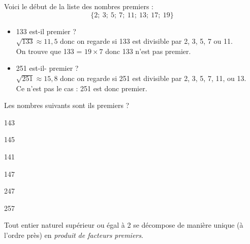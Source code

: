 \begin{methode}
	Voici le début de la liste des nombres premiers :
	$$\lbrace 2;\ 3;\ 5;\ 7;\ 11;\ 13;\ 17;\ 19\rbrace$$
	\begin{itemize}
		\item 	133 est-il premier ?\\
		      
		      $\sqrt{133}\approx 11,5$ donc on regarde si 133 est divisible par 2, 3, 5, 7 ou 11.\\
		      On trouve que 133 = $19\times 7$ donc 133 n'est pas premier.
		\item 	251 est-il- premier ?\\
	
		      $\sqrt{251}\approx 15,8$ donc on regarde si 251 est divisible par 2, 3, 5, 7, 11, ou 13.\\
		      Ce n'est pas le cas : 251 est donc premier.
	\end{itemize}
\end{methode}

\begin{exercice}[]
	
	
	Les nombres suivants sont ils premiers ?
	
	\begin{multicols}{2}
		\begin{enumalph}
			\item 143
			\item 145
			\item 141
			\item 147
			\item 247
			\item 257
		\end{enumalph}
	\end{multicols}
	
\end{exercice}


\begin{propriete}
	Tout entier naturel supérieur ou égal à 2 se décompose de manière unique (à l'ordre près) en \textit{produit de facteurs premiers}.
\end{propriete}


